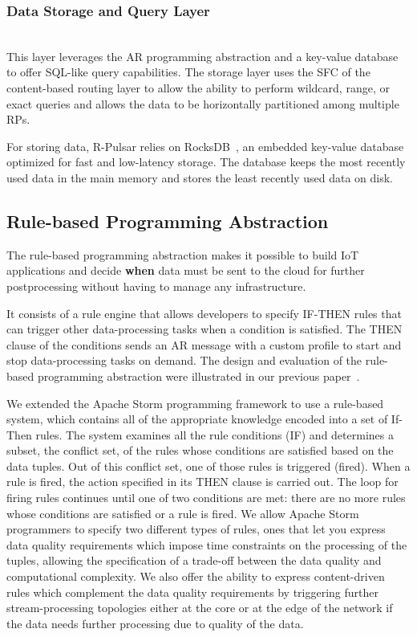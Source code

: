 \vspace{1.5ex}
\subsubsection{Data Storage and Query Layer}
\hfill\\
This layer leverages the AR programming abstraction and a key-value database to offer SQL-like query capabilities. The storage layer uses the SFC of the content-based routing layer to allow the ability to perform wildcard, range, or exact queries and allows the data to be horizontally partitioned among multiple RPs. 

For storing data, R-Pulsar relies on RocksDB~\cite{rocks}, an embedded key-value database optimized for fast and low-latency storage. The database keeps the most recently used data in the main memory and stores the least recently used data on disk.

\subsection{Rule-based Programming Abstraction}\label{sec:programming-data}
The rule-based programming abstraction makes it possible to build IoT applications and decide \textbf{when} data must be sent to the cloud for further postprocessing without having to manage any infrastructure.

It consists of a rule engine that allows developers to specify IF-THEN rules that can trigger other data-processing tasks when a condition is satisfied. The THEN clause of the conditions sends an AR message with a custom profile to start and stop data-processing tasks on demand. The design and evaluation of the rule-based programming abstraction were illustrated in our previous paper~\cite{rules}.

We extended the Apache Storm programming framework to use a rule-based system, which contains all of the appropriate knowledge encoded into a set of If-Then rules. The system examines all the rule conditions (IF) and determines a subset, the conflict set, of the rules whose conditions are satisfied based on the data tuples. Out of this conflict set, one of those rules is triggered (fired). When a rule is fired, the action specified in its THEN clause is carried out. The loop for firing rules continues until one of two conditions are met: there are no more rules whose conditions are satisfied or a rule is fired. We allow Apache Storm programmers to specify two different types of rules, ones that let you express data quality requirements which impose time constraints on the processing of the tuples, allowing the specification of a trade-off between the data quality and computational complexity. We also offer the ability to express content-driven rules which complement the data quality requirements by triggering further stream-processing topologies either at the core or at the edge of the network if the data needs further processing due to quality of the data.

